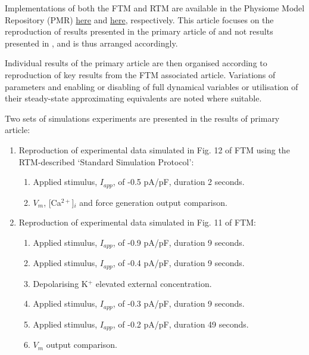 \documentclass[fleqn,10pt]{physiome}
\newcommand{\cacyts}{[Ca$^{2+}$]$_i$ }
\newcommand{\pos}{K$^+$  }
\begin{document}
Implementations of both the FTM and RTM are available in the Physiome Model Repository (PMR) \href{https://models.physiomeproject.org/workspace/261}{here} and \href{https://models.physiomeproject.org/workspace/8bc}{here}, respectively. This article focuses on the reproduction of results presented in the primary article of \cite{means2022} and not results presented in \cite{tong2011}, and is thus arranged accordingly. 

Individual results of the primary article are then organised according to reproduction of key results from the FTM associated article. Variations of parameters and enabling or disabling of full dynamical variables or utilisation of their steady-state approximating equivalents are noted where suitable. 

Two sets of simulations experiments are presented in the results of primary article:

\begin{enumerate}
	\item Reproduction of experimental data simulated in Fig. 12 of FTM using the RTM-described `Standard Simulation Protocol':
	\begin{enumerate}
		\item Applied stimulus, $I_{app}$, of -0.5 pA/pF, duration 2 seconds.
		\item $V_m$, \cacyts and force generation output comparison.
	\end{enumerate}
	\item Reproduction of experimental data simulated in Fig. 11 of FTM:
	\begin{enumerate}
		\item Applied stimulus, $I_{app}$, of -0.9 pA/pF, duration 9 seconds.
		\item Applied stimulus, $I_{app}$, of -0.4 pA/pF, duration 9 seconds.
		\item Depolarising \pos elevated external concentration.
		\item Applied stimulus, $I_{app}$, of -0.3 pA/pF, duration 9 seconds.
		\item Applied stimulus, $I_{app}$, of -0.2 pA/pF, duration 49 seconds.
		\item $V_m$ output comparison.
	\end{enumerate}
\end{enumerate}

\end{document}
